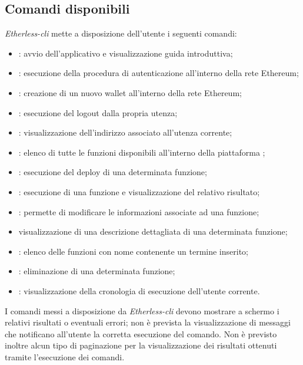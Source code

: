 \subsection{Comandi disponibili}
\textit{Etherless-cli} mette a disposizione dell'utente i seguenti comandi: 
\begin{itemize}
	\item \init{}: avvio dell'applicativo e visualizzazione guida introduttiva; 
	\item \login{}: esecuzione della procedura di autenticazione all'interno della rete Ethereum; 
	\item \signup{}: creazione di un nuovo wallet all'interno della rete Ethereum; 
	\item \logout{}: esecuzione del logout dalla propria utenza; 
	\item \whoami{}: visualizzazione dell'indirizzo associato all'utenza corrente; 
	\item \lista{}: elenco di tutte le funzioni disponibili all'interno della piattaforma \NomeProgetto{}; 
	\item \deploy{}: esecuzione del deploy di una determinata funzione;  
	\item \run{}: esecuzione di una funzione e visualizzazione del relativo risultato; 
	\item \edit{}: permette di modificare le informazioni associate ad una funzione; 
	\item \info{} visualizzazione di una descrizione dettagliata di una determinata funzione; 
	\item \search{}: elenco delle funzioni con nome contenente un termine inserito; 
	\item \delete{}: eliminazione di una determinata funzione;
	\item \history{}: visualizzazione della cronologia di esecuzione dell'utente corrente. 
\end{itemize}
I comandi messi a disposizione da \textit{Etherless-cli} devono mostrare a schermo i relativi risultati o eventuali errori; non è prevista la visualizzazione di messaggi che notificano all'utente la corretta esecuzione del comando. Non è previsto inoltre alcun tipo di paginazione per la visualizzazione dei risultati ottenuti tramite l'esecuzione dei comandi.


